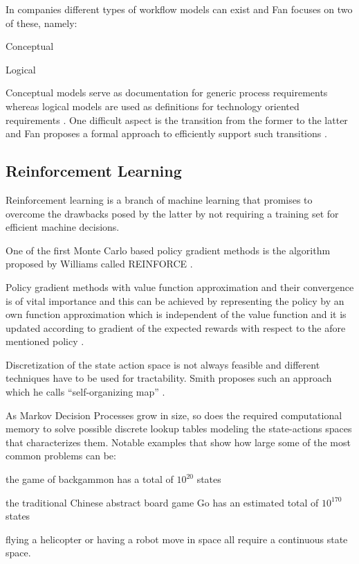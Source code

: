\documentclass{seal_thesis}
\begin{document}
In companies different types of workflow models can exist and Fan focuses on two of these, namely:
\begin{enumerate*}
	\item Conceptual
	\item Logical
\end{enumerate*}

Conceptual models serve as documentation for generic process requirements whereas logical models are used as definitions for technology oriented requirements \cite{Fan2012}. One difficult aspect is the transition from the former to the latter and Fan proposes a formal approach to efficiently support such transitions \cite{Fan2012}.

\subsection{Reinforcement Learning}

Reinforcement learning is a branch of machine learning that promises to overcome the drawbacks posed by the latter by not requiring a training set for efficient machine decisions.

One of the first Monte Carlo based policy gradient methods is the algorithm proposed by Williams called REINFORCE \cite{Williams1992}.

Policy gradient methods with value function approximation and their convergence is of vital importance and this can be achieved by representing the policy by an own function approximation which is independent of the value function and it is updated according to gradient of the expected rewards with respect to the afore mentioned policy \cite{Sutton1999}.

Discretization of the state action space is not always feasible and different techniques have to be used for tractability. Smith proposes such an approach which he calls ``self-organizing map'' \cite{Smith2002}.

As Markov Decision Processes grow in size, so does the required computational memory to solve possible discrete lookup tables modeling the state-actions spaces that characterizes them. Notable examples that show how large some of the most common problems can be:
\begin{enumerate*}
	\item the game of backgammon has a total of $10^{20}$ states
	\item the traditional Chinese abstract board game Go has an estimated total of $10^{170}$ states
	\item flying a helicopter or having a robot move in space all require a continuous state space.
\end{enumerate*}
\end{document}
